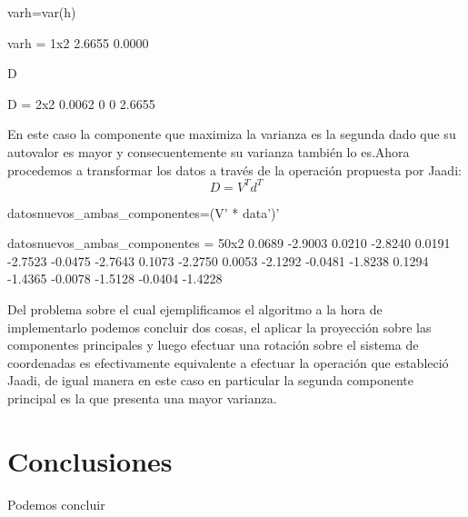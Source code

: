 \documentclass{article}
\begin{document}
\begin{matlabcode}
varh=var(h)
\end{matlabcode}
\begin{matlaboutput}
varh = 1x2    
    2.6655    0.0000
\end{matlaboutput}
\begin{matlabcode}
D
\end{matlabcode}
\begin{matlaboutput}
D = 2x2    
    0.0062         0
         0    2.6655
\end{matlaboutput}
En este caso la componente que maximiza la varianza es la segunda dado que su autovalor es mayor y consecuentemente su varianza también lo es.Ahora procedemos a transformar los datos a través de la operación propuesta por Jaadi:
\[D=V^{T}d^{T}\]
\begin{matlabcode}
datosnuevos_ambas_componentes=(V' * data')'
\end{matlabcode}
\begin{matlaboutput}
datosnuevos_ambas_componentes = 50x2    
    0.0689   -2.9003
    0.0210   -2.8240
    0.0191   -2.7523
   -0.0475   -2.7643
    0.1073   -2.2750
    0.0053   -2.1292
   -0.0481   -1.8238
    0.1294   -1.4365
   -0.0078   -1.5128
   -0.0404   -1.4228
\end{matlaboutput}
Del problema sobre el cual ejemplificamos el algoritmo a la hora de implementarlo podemos concluir dos cosas, el aplicar la proyección sobre las componentes principales y luego efectuar una rotación sobre el sistema de coordenadas es efectivamente equivalente a efectuar la operación que estableció Jaadi, de igual manera en este caso en particular la segunda componente principal es la que presenta una mayor varianza. 
\section{Conclusiones}
Podemos concluir 


\end{document}
